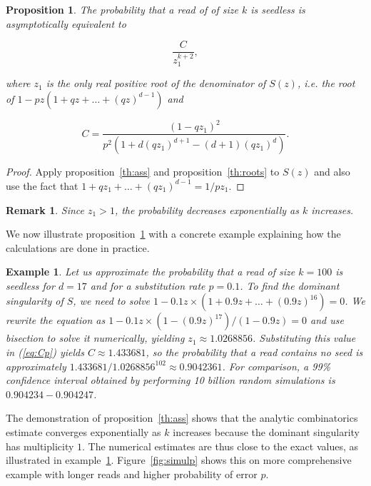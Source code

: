 \documentclass{article}
\newtheorem{example}{Example}
\newtheorem{proposition}{Proposition}
\newtheorem{remark}{Remark}
\begin{document}
\begin{proposition}
\label{th:p}
The probability that a read of of size $k$ is seedless is
asymptotically equivalent to

\begin{equation*}
\frac{C}{z_1^{k+2}},
\end{equation*}

\noindent
where $z_1$ is the only real positive root of the denominator of $S(z)$,
\textit{i.e.} the root of $1-pz(1+qz+\ldots+(qz)^{d-1})$ and

\begin{equation}
\label{eq:Cp}
C =\frac{(1-qz_1)^2}{p^2\left( 1 + d(qz_1)^{d+1} - (d+1)(qz_1)^d
\right)}.
\end{equation}

\end{proposition}

\begin{proof}
Apply proposition~\ref{th:ass} and proposition~\ref{th:roots} to $S(z)$
and also use the fact that $1+qz_1+\ldots+(qz_1)^{d-1} = 1/pz_1$.
\end{proof}

\begin{remark}
Since $z_1 > 1$, the probability decreases exponentially
as $k$ increases.
\end{remark}

We now illustrate proposition~\ref{th:p} with a concrete example
explaining how the calculations are done in practice.

\begin{example}
\label{ex:num}
Let us approximate the probability that a read of size $k=100$ is seedless
for $d=17$ and for a substitution rate $p=0.1$. To find the dominant
singularity of $S$, we need to solve
$1-0.1z\times(1+0.9z+\ldots+(0.9z)^{16}) = 0$.  We rewrite the equation as
$1 - 0.1z\times(1-(0.9 z)^{17})/(1-0.9z) = 0$ and use bisection to solve
it numerically, yielding $z_1 \approx 1.0268856$. Substituting this value
in (\ref{eq:Cp}) yields $C \approx 1.433681$, so the probability that a
read contains no seed is approximately $1.433681 / 1.0268856^{102} \approx
0.9042361$. For comparison, a 99\% confidence interval obtained by
performing 10 billion random simulations is $0.904234-0.904247$.
\end{example}

The demonstration of proposition~\ref{th:ass} shows that the analytic
combinatorics estimate converges exponentially as $k$ increases because
the dominant singularity has multiplicity $1$. The numerical estimates are
thus close to the exact values, as illustrated in example~\ref{ex:num}.
Figure~\ref{fig:simulp} shows this on more comprehensive example
with longer reads and higher probability of error $p$.
\end{document}
